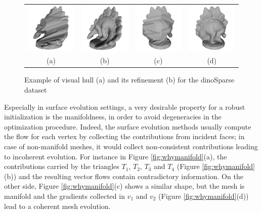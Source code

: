 \begin{figure}[t]
\centering
 \begin{tabular}{cccc}
  \includegraphics[width=0.2\columnwidth]{./img/ch_soa/dinoHull01}&
  \includegraphics[width=0.2\columnwidth]{./img/ch_soa/dinoRef01}&
  \includegraphics[width=0.2\columnwidth]{./img/ch_soa/dinoHull02}&
  \includegraphics[width=0.2\columnwidth]{./img/ch_soa/dinoRef02}\\
  (a)&(b)&(c)&(d)
 \end{tabular}
 \caption{Example of visual hull (a) and its refinement (b) for the dinoSparse dataset \cite{seitz_et_al06}}
 \label{fig:visualhullex}
\end{figure}



Especially in surface evolution settings, a very desirable property for a robust initialization is the manifoldness, in order to avoid degeneracies in the optimization procedure. 
Indeed, the surface evolution methods usually compute the flow for each vertex by collecting the contributions from incident faces; in case of non-manifold meshes, it would collect non-consistent contributions leading to incoherent evolution.
For instance in Figure \ref{fig:whymanifold}(a), the contributions  carried by the triangles $T_1$, $T_2$, $T_3$ and $T_4$ (Figure \ref{fig:whymanifold}(b)) and the resulting vector flows contain contradictory information.
On the other side, Figure \ref{fig:whymanifold}(c) shows a similar shape, but the mesh is manifold and the gradients collected in $v_1$ and $v_2$ (Figure \ref{fig:whymanifold}(d)) lead to a coherent mesh evolution.

